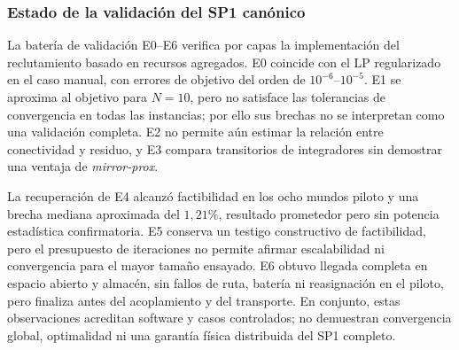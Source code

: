 \subsubsection{Estado de la validación del SP1 canónico}
\label{subsubsec:sp1-validation-status}

La batería de validación E0--E6 verifica por capas la implementación del
reclutamiento basado en recursos agregados. E0 coincide con el LP regularizado en el caso
manual, con errores de objetivo del orden de \(10^{-6}\)--\(10^{-5}\). E1 se
aproxima al objetivo para \(N=10\), pero no satisface las tolerancias de
convergencia en todas las instancias; por ello sus brechas no se interpretan
como una validación completa. E2 no permite aún estimar la relación entre
conectividad y residuo, y E3 compara transitorios de integradores sin
demostrar una ventaja de \emph{mirror-prox}.

La recuperación de E4 alcanzó factibilidad en los ocho mundos piloto y una
brecha mediana aproximada del \(1{,}21\%\), resultado prometedor pero sin
potencia estadística confirmatoria. E5 conserva un testigo constructivo de
factibilidad, pero el presupuesto de iteraciones no permite afirmar
escalabilidad ni convergencia para el mayor tamaño ensayado. E6 obtuvo llegada
completa en espacio abierto y almacén, sin fallos de ruta, batería ni
reasignación en el piloto, pero finaliza antes del acoplamiento y del transporte.
En conjunto, estas observaciones acreditan software y casos
controlados; no demuestran convergencia global, optimalidad ni una garantía
física distribuida del SP1 completo.
